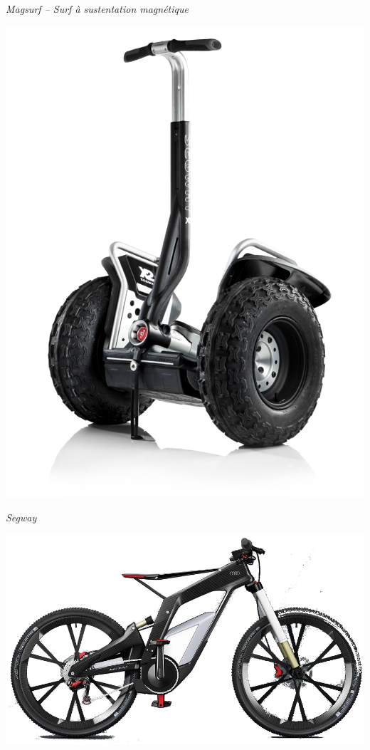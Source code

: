 \documentclass[11pt,oneside]{article}
\begin{document}
\begin{exemple}
\begin{minipage}[c]{.22\linewidth}
\begin{center}
\textit{Magsurf -- Surf à sustentation magnétique \cite{magsurf}}
\end{center}
\end{minipage} \hfill
\begin{minipage}[c]{.22\linewidth}
\begin{center}
\includegraphics[width=\textwidth]{png/segway}

\textit{Segway\cite{segway}}
\end{center}
\end{minipage}\hfill
\begin{minipage}[c]{.22\linewidth}
\begin{center}
\includegraphics[width=\textwidth]{png/velo_audi}


\end{center}
\end{minipage}
\end{exemple}
\end{document}
